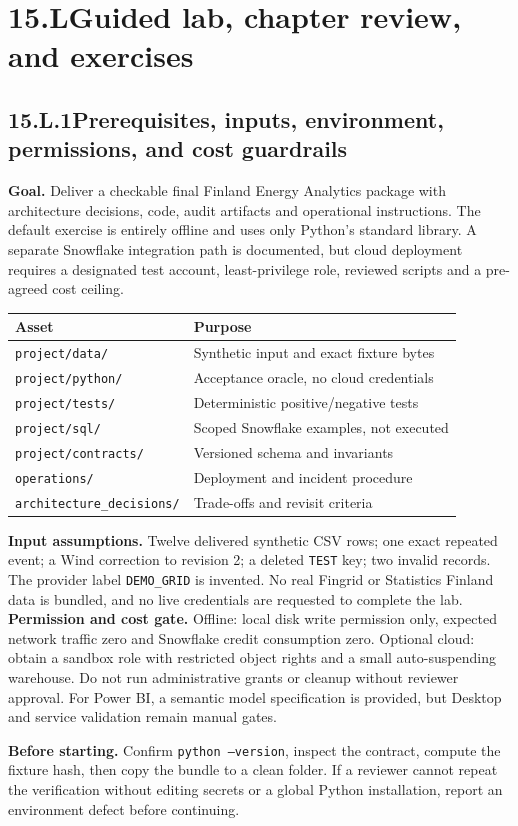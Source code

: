 \documentclass[11pt,twoside]{article}
\newcommand{\topic}[2]{\subsection*{#1\quad #2}}
\begin{document}
\newpage

\section*{15.L\quad Guided lab, chapter review, and exercises}
\topic{15.L.1}{Prerequisites, inputs, environment, permissions, and cost guardrails}
\textbf{Goal.} Deliver a checkable final Finland Energy Analytics package with architecture decisions, code, audit artifacts and operational instructions. The default exercise is entirely offline and uses only Python's standard library. A separate Snowflake integration path is documented, but cloud deployment requires a designated test account, least-privilege role, reviewed scripts and a pre-agreed cost ceiling.
\begin{center}\small\begin{tabularx}{\linewidth}{@{}p{37mm}X@{}}\toprule
Asset & Purpose\\\midrule
\texttt{project/data/} & Synthetic input and exact fixture bytes\\
\texttt{project/python/} & Acceptance oracle, no cloud credentials\\
\texttt{project/tests/} & Deterministic positive/negative tests\\
\texttt{project/sql/} & Scoped Snowflake examples, not executed\\
\texttt{project/contracts/} & Versioned schema and invariants\\
\texttt{operations/} & Deployment and incident procedure\\
\texttt{architecture\_}\allowbreak\texttt{decisions/} & Trade-offs and revisit criteria\\\bottomrule\end{tabularx}\end{center}
\textbf{Input assumptions.} Twelve delivered synthetic CSV rows; one exact repeated event; a Wind correction to revision 2; a deleted \texttt{TEST} key; two invalid records. The provider label \texttt{DEMO\_GRID} is invented. No real Fingrid or Statistics Finland data is bundled, and no live credentials are requested to complete the lab.
\textbf{Permission and cost gate.} Offline: local disk write permission only, expected network traffic zero and Snowflake credit consumption zero. Optional cloud: obtain a sandbox role with restricted object rights and a small auto-suspending warehouse. Do not run administrative grants or cleanup without reviewer approval. For Power BI, a semantic model specification is provided, but Desktop and service validation remain manual gates.
\begin{whitebox}\textbf{Before starting.} Confirm \texttt{python --version}, inspect the contract, compute the fixture hash, then copy the bundle to a clean folder. If a reviewer cannot repeat the verification without editing secrets or a global Python installation, report an environment defect before continuing.\end{whitebox}
\end{document}
